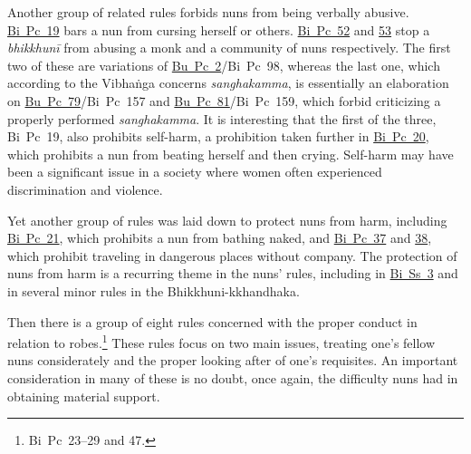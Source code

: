\documentclass[12pt,openany]{book}%
\begin{document}
Another group of related rules forbids nuns from being verbally abusive. \href{https://suttacentral.net/pli-tv-bi-vb-pc19/en/brahmali\#1.17.1}{Bi~Pc~19} bars a nun from cursing herself or others. \href{https://suttacentral.net/pli-tv-bi-vb-pc52/en/brahmali\#1.29.1}{Bi~Pc~52} and \href{https://suttacentral.net/pli-tv-bi-vb-pc53/en/brahmali\#1.27.1}{53} stop a \textit{\textsanskrit{bhikkhunī}} from abusing a monk and a community of nuns respectively. The first two of these are variations of \href{https://suttacentral.net/pli-tv-bu-vb-pc2/en/brahmali\#1.2.33.1}{Bu~Pc~2}/Bi Pc 98, whereas the last one, which according to the \textsanskrit{Vibhaṅga} concerns \textit{sanghakamma}, is essentially an elaboration on \href{https://suttacentral.net/pli-tv-bu-vb-pc79/en/brahmali\#1.22.1}{Bu~Pc~79}/Bi Pc 157 and \href{https://suttacentral.net/pli-tv-bu-vb-pc81/en/brahmali\#1.16.1}{Bu~Pc~81}/Bi Pc 159, which forbid criticizing a properly performed \textit{sanghakamma}. It is interesting that the first of the three, Bi Pc 19, also prohibits self-harm, a prohibition taken further in \href{https://suttacentral.net/pli-tv-bi-vb-pc20/en/brahmali\#1.11.1}{Bi~Pc~20}, which prohibits a nun from beating herself and then crying. Self-harm may have been a significant issue in a society where women often experienced discrimination and violence.

Yet another group of rules was laid down to protect nuns from harm, including \href{https://suttacentral.net/pli-tv-bi-vb-pc21/en/brahmali\#1.16.1}{Bi~Pc~21}, which prohibits a nun from bathing naked, and \href{https://suttacentral.net/pli-tv-bi-vb-pc37/en/brahmali\#1.12.1}{Bi~Pc~37} and \href{https://suttacentral.net/pli-tv-bi-vb-pc38/en/brahmali\#1.12.1}{38}, which prohibit traveling in dangerous places without company. The protection of nuns from harm is a recurring theme in the nuns’ rules, including in \href{https://suttacentral.net/pli-tv-bi-vb-ss3/en/brahmali\#1.1}{Bi~Ss~3} and in several minor rules in the Bhikkhuni-kkhandhaka.

Then there is a group of eight rules concerned with the proper conduct in relation to robes.\footnote{Bi Pc 23–29 and 47. } These rules focus on two main issues, treating one’s fellow nuns considerately and the proper looking after of one’s requisites. An important consideration in many of these is no doubt, once again, the difficulty nuns had in obtaining material support.
\end{document}
